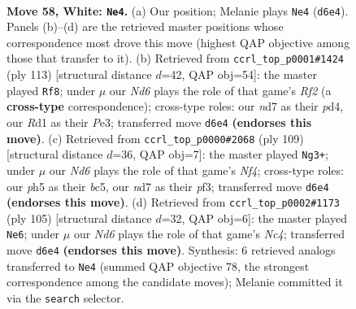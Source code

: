\documentclass[11pt]{article}
\begin{document}
\clearpage

\begin{figure}[p]\centering
\begin{subfigure}{0.46\textwidth}\centering
\resizebox{\linewidth}{!}{%
\newchessgame
\chessboard[
  setfen={6rk/3nQ3/2qN4/7p/p2p4/P7/8/3R3K w - - 4 58},
  showmover=false,
  pgfstyle=straightmove, color=movearrow, markmove={d6-e4}
]}
\caption{}
\end{subfigure}\hfill
\begin{subfigure}{0.46\textwidth}\centering
\resizebox{\linewidth}{!}{%
\newchessgame
\chessboard[
  setfen={3Q3k/1p3r2/8/5q2/3P4/4p3/7P/1R5K b - - 1 57},
  showmover=false,
  pgfstyle=straightmove, color=movearrow, markmove={f7-f8}
]}
\caption{}
\end{subfigure}
\\[4pt]
\begin{subfigure}{0.46\textwidth}\centering
\resizebox{\linewidth}{!}{%
\newchessgame
\chessboard[
  setfen={8/7k/6q1/2B1Qn2/7p/5P1P/2Pr4/6RK b - - 2 55},
  showmover=false,
  pgfstyle=straightmove, color=movearrow, markmove={f5-g3}
]}
\caption{}
\end{subfigure}\hfill
\begin{subfigure}{0.46\textwidth}\centering
\resizebox{\linewidth}{!}{%
\newchessgame
\chessboard[
  setfen={4r2k/2q5/3R4/2nQ2P1/6p1/8/5P2/6K1 b - - 2 53},
  showmover=false,
  pgfstyle=straightmove, color=movearrow, markmove={c5-e6}
]}
\caption{}
\end{subfigure}
\caption{\textbf{Move 58, White: \texttt{Ne4}.} (a) Our position; Melanie plays \texttt{Ne4} (\texttt{d6e4}). Panels (b)--(d) are the retrieved master positions whose correspondence most drove this move (highest QAP objective among those that transfer to it). (b) Retrieved from \texttt{ccrl\_top\_p0001\#1424} (ply 113) [structural distance $d$=42, QAP obj=54]: the master played \texttt{Rf8}; under $\mu$ our \emph{Nd6} plays the role of that game's \emph{Rf2} (a \textbf{cross-type} correspondence); cross-type roles: our \emph{n}d7 as their \emph{p}d4, our \emph{R}d1 as their \emph{P}e3; transferred move \texttt{d6e4} \textbf{(endorses this move)}. (c) Retrieved from \texttt{ccrl\_top\_p0000\#2068} (ply 109) [structural distance $d$=36, QAP obj=7]: the master played \texttt{Ng3+}; under $\mu$ our \emph{Nd6} plays the role of that game's \emph{Nf4}; cross-type roles: our \emph{p}h5 as their \emph{b}c5, our \emph{n}d7 as their \emph{p}f3; transferred move \texttt{d6e4} \textbf{(endorses this move)}. (d) Retrieved from \texttt{ccrl\_top\_p0002\#1173} (ply 105) [structural distance $d$=32, QAP obj=6]: the master played \texttt{Ne6}; under $\mu$ our \emph{Nd6} plays the role of that game's \emph{Nc4}; transferred move \texttt{d6e4} \textbf{(endorses this move)}. Synthesis: 6 retrieved analogs transferred to \texttt{Ne4} (summed QAP objective 78, the strongest correspondence among the candidate moves); Melanie committed it via the \texttt{search} selector.}
\label{fig:thought-m114}
\end{figure}
\end{document}
